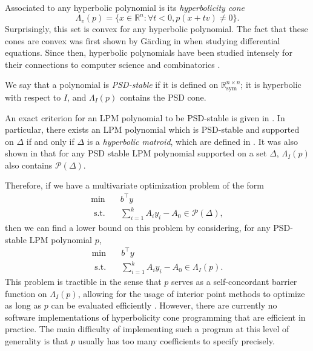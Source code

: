 \documentclass{amsart}
\theoremstyle{definition}
\newcommand{\R}{\mathbb{R}}
\renewcommand{\P}{\mathcal{P}}
\newcommand{\st}{{\text{ s.t. }}}
\newcommand*{\Sym}{\R^{n \times n}_{\mathrm{sym}}}
\begin{document}
Associated to any hyperbolic polynomial is its \emph{hyperbolicity cone}
\[
    \Lambda_v(p) = \{x \in \R^n : \forall t < 0, p(x + t v) \neq 0\}.
\]
Surprisingly, this set is convex for any hyperbolic polynomial. The fact that these cones are convex was first shown by G\"arding in \cite{gaarding1951linear} when studying differential equations.
Since then, hyperbolic polynomials have been studied intensely for their connections to computer science and combinatorics \cite{saunderson2019certifying, gurvits2007van, wagner2011multivariate}.

We say that a polynomial is \emph{PSD-stable} if it is defined on $\Sym$; it is hyperbolic with respect to $I$, and $\Lambda_I(p)$ contains the PSD cone.

An exact criterion for an LPM polynomial to be PSD-stable is given in \cite{blekherman2021linear}.
In particular, there exists an LPM polynomial which is PSD-stable and supported on $\Delta$ if and only if $\Delta$ is a \emph{hyperbolic matroid}, which are defined in \cite{choe2004homogeneous}.
It was also shown in \cite{blekherman2021linear} that for any PSD stable LPM polynomial supported on a set $\Delta$, $\Lambda_I(p)$ also contains $\mathcal{P}(\Delta)$.

Therefore, if we have a multivariate optimization problem of the form
\begin{equation}
    \begin{aligned}
        \min\quad & b^{\intercal} y\\
        \st & \sum_{i=1}^k A_i y_i - A_0 \in \P(\Delta),
    \end{aligned}
\end{equation}
then we can find a lower bound on this problem by considering, for any PSD-stable LPM polynomial $p$,
\begin{equation}\label{eq:sparse_lpm_dual}
    \begin{aligned}
        \min\quad & b^{\intercal} y\\
        \st & \sum_{i=1}^k A_i y_i - A_0 \in \Lambda_I(p).
    \end{aligned}
\end{equation}
This problem is tractible in the sense that $p$ serves as a self-concordant barrier function on $\Lambda_I(p)$, allowing for the usage of interior point methods to optimize as long as $p$ can be evaluated efficiently \cite{guler1997hyperbolic}.
However, there are currently no software implementations of hyperbolicity cone programming that are efficient in practice.
The main difficulty of implementing such a program at this level of generality is that $p$ usually has too many coefficients to specify precisely.
\end{document}
